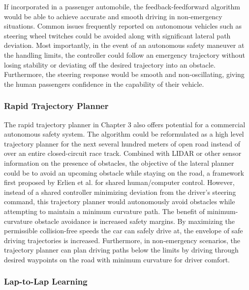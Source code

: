 If incorporated in a passenger automobile, the feedback-feedforward algorithm would be able to achieve accurate and smooth driving
in non-emergency situations. Common issues frequently reported on autonomous vehicles such as steering wheel twitches could be avoided
along with significant lateral path deviation. Most importantly, in the event of an autonomous safety maneuver at the handling limits, the controller
could follow an emergency trajectory without losing stability or deviating off the desired trajectory into an obstacle. Furthermore, the steering
response would be smooth and non-oscillating, giving the human passengers confidence in the capability of their vehicle. 

\subsubsection{Rapid Trajectory Planner}

The rapid trajectory planner in Chapter 3 also offers potential for a commercial autonomous safety system. The algorithm could 
be reformulated as a high level trajectory planner for the next several hundred meters of open road instead of over an entire
closed-circuit race track. Combined with LIDAR or other sensor information on the presence of obstacles, the 
objective of the lateral planner could be to avoid an upcoming obstacle while staying on the road, a 
framework first proposed by Erlien et al. \cite{erlienACC} for shared human/computer control. However, instead of a shared controller minimizing deviation from the 
driver's steering command, this trajectory planner would autonomously avoid obstacles while attempting to
 maintain a minimum curvature path. The benefit of minimum-curvature obstacle avoidance is increased safety margins. By maximizing the permissible
 collision-free speeds the car can safely drive at, the envelope of safe driving trajectories is increased. Furthermore, in non-emergency scenarios,
 the trajectory planner can plan driving paths below the limits by driving through desired waypoints on the road with minimum curvature for
 driver comfort. 
 
 \subsubsection{Lap-to-Lap Learning}
  
